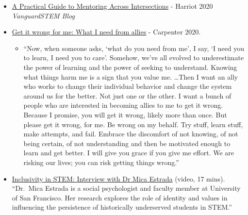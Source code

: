 \documentclass[
  letterpaper,
  DIV=11,
  numbers=noendperiod]{scrreprt}
\providecommand{\tightlist}{%
  \setlength{\itemsep}{0pt}\setlength{\parskip}{0pt}}
\begin{document}
\begin{itemize}
\tightlist
\item
  \href{https://conversations.vanguardstem.com/a-practical-guide-to-mentoring-across-intersections-c596496ee334}{A
  Practical Guide to Mentoring Across Intersections} - Harriot 2020
  \emph{VanguardSTEM Blog}
\item
  \href{https://www.linkedin.com/pulse/get-wrong-me-what-i-need-from-allies-megan-carpenter/?trackingId=XxaMtahqr9ZJfAGcCptmFQ\%3D\%3D}{Get
  it wrong for me: What I need from allies} - Carpenter 2020.

  \begin{itemize}
  \tightlist
  \item
    ``Now, when someone asks, `what do you need from me', I say, `I need
    you to learn, I need you to care'. Somehow, we've all evolved to
    underestimate the power of learning and the power of seeking to
    understand. Knowing what things harm me is a sign that you value me.
    \ldots Then I want an ally who works to change their individual
    behavior and change the system around us for the better. Not just
    one or the other. I want a bunch of people who are interested in
    becoming allies to me to get it wrong. Because I promise, you will
    get it wrong, likely more than once. But please get it wrong, for
    me. Be wrong on my behalf. Try stuff, learn stuff, make attempts,
    and fail. Embrace the discomfort of not knowing, of not being
    certain, of not understanding and then be motivated enough to learn
    and get better. I will give you grace if you give me effort. We are
    risking our lives; you can risk getting things wrong.''
  \end{itemize}
\item
  \href{https://www.youtube.com/watch?v=AcGJ_Ldkjps}{Inclusivity in
  STEM: Interview with Dr Mica Estrada} (video, 17 mins). ``Dr.~Mica
  Estrada is a social psychologist and faculty member at University of
  San Francisco. Her research explores the role of identity and values
  in influencing the persistence of historically underserved students in
  STEM.''


\end{itemize}
\end{document}
